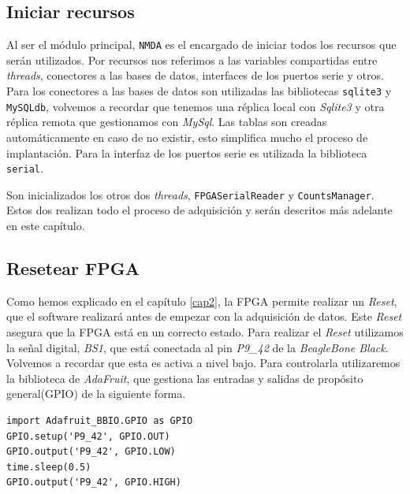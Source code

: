         \subsection{Iniciar recursos}
            Al ser el módulo principal, \texttt{NMDA} es el encargado de
            iniciar todos los recursos que serán utilizados. Por recursos nos
            referimos a las variables compartidas entre \emph{threads},
            conectores a las bases de datos, interfaces de los puertos serie y
            otros. Para los conectores a las bases de datos son utilizadas las
            bibliotecas \texttt{sqlite3} y \texttt{MySQLdb}, volvemos a
            recordar que tenemos una réplica local con \emph{Sqlite3} y otra
            réplica remota que gestionamos con \emph{MySql}. Las tablas son
            creadas automáticamente en caso de no existir, esto simplifica
            mucho el proceso de implantación. Para la interfaz de los puertos
            serie es utilizada la biblioteca \texttt{serial}.
            \par
            Son inicializados los otros dos \emph{threads},
            \texttt{FPGASerialReader} y \texttt{CountsManager}. Estos dos
            realizan todo el proceso de adquisición y serán descritos más
            adelante en este capítulo. 
        \subsection{Resetear FPGA}
            Como hemos explicado en el capítulo \ref{cap2}, la FPGA
            permite realizar un \emph{Reset}, que el software realizará antes
            de empezar con la adquisición de datos. Este \emph{Reset} asegura
            que la FPGA está en un correcto estado. Para realizar el
            \emph{Reset} utilizamos la señal digital, \emph{BS1}, que está
            conectada al pin \emph{P9\_42} de la \emph{BeagleBone Black}.
            Volvemos a recordar que esta es activa a nivel bajo. Para
            controlarla utilizaremos la biblioteca de
            \emph{AdaFruit}\cite{AdaFruitGit}, que gestiona las entradas y
            salidas de propósito general(GPIO) de la siguiente forma.
            \begin{lstlisting}[style=myPython]
import Adafruit_BBIO.GPIO as GPIO
GPIO.setup('P9_42', GPIO.OUT)
GPIO.output('P9_42', GPIO.LOW)
time.sleep(0.5)
GPIO.output('P9_42', GPIO.HIGH)
            \end{lstlisting}


